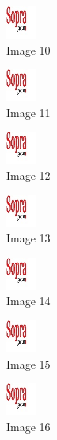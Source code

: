 \begin{figure}[!h]
  \center
  \includegraphics[width=1cm]{img/test.jpg}
  \caption{Image 10}
\end{figure}

\begin{figure}[!h]
  \center
  \includegraphics[width=1cm]{img/test.jpg}
  \caption{Image 11}
\end{figure}

\begin{figure}[!h]
  \center
  \includegraphics[width=1cm]{img/test.jpg}
  \caption{Image 12}
\end{figure}

\begin{figure}[!h]
  \center
  \includegraphics[width=1cm]{img/test.jpg}
  \caption{Image 13}
\end{figure}

\begin{figure}[!h]
  \center
  \includegraphics[width=1cm]{img/test.jpg}
  \caption{Image 14}
\end{figure}

\begin{figure}[!h]
  \center
  \includegraphics[width=1cm]{img/test.jpg}
  \caption{Image 15}
\end{figure}

\begin{figure}[!h]
  \center
  \includegraphics[width=1cm]{img/test.jpg}
  \caption{Image 16}
\end{figure}

